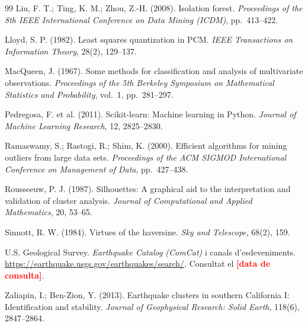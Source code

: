 \documentclass[11pt,a4paper]{article}
\newcommand{\pend}[1]{\textcolor{red}{\textbf{[#1]}}}
\begin{document}
\begin{thebibliography}{99}
 Liu, F. T.; Ting, K. M.; Zhou, Z.-H. (2008). Isolation
forest. \textit{Proceedings of the 8th IEEE International Conference on Data
Mining (ICDM)}, pp.~413--422.

 Lloyd, S. P. (1982). Least squares quantization in PCM.
\textit{IEEE Transactions on Information Theory}, 28(2), 129--137.

 MacQueen, J. (1967). Some methods for classification
and analysis of multivariate observations. \textit{Proceedings of the 5th
Berkeley Symposium on Mathematical Statistics and Probability}, vol.~1,
pp.~281--297.

 Pedregosa, F. et al. (2011). Scikit-learn: Machine
learning in Python. \textit{Journal of Machine Learning Research}, 12,
2825--2830.

 Ramaswamy, S.; Rastogi, R.; Shim, K. (2000). Efficient
algorithms for mining outliers from large data sets. \textit{Proceedings of the
ACM SIGMOD International Conference on Management of Data}, pp.~427--438.

 Rousseeuw, P. J. (1987). Silhouettes: A graphical aid
to the interpretation and validation of cluster analysis. \textit{Journal of
Computational and Applied Mathematics}, 20, 53--65.

 Sinnott, R. W. (1984). Virtues of the haversine.
\textit{Sky and Telescope}, 68(2), 159.

 U.S. Geological Survey. \textit{Earthquake Catalog (ComCat)} i
canals d'esdeveniments. \url{https://earthquake.usgs.gov/earthquakes/search/}.
Consultat el \pend{data de consulta}.

 Zaliapin, I.; Ben-Zion, Y. (2013). Earthquake clusters in
southern California I: Identification and stability. \textit{Journal of
Geophysical Research: Solid Earth}, 118(6), 2847--2864.

\end{thebibliography}
\end{document}

